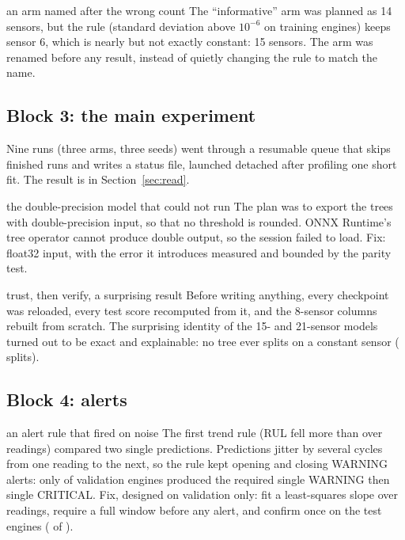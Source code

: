 \documentclass[11pt,a4paper]{article}
\begin{document}
\begin{mistake}{an arm named after the wrong count}
The ``informative'' arm was planned as 14 sensors, but the rule (standard deviation above $10^{-6}$ on training
engines) keeps sensor 6, which is nearly but not exactly constant: 15 sensors. The arm was renamed before any
result, instead of quietly changing the rule to match the name.
\end{mistake}

\subsection{Block 3: the main experiment}
Nine runs (three arms, three seeds) went through a resumable queue that skips finished runs and writes a status
file, launched detached after profiling one short fit. The result is in Section~\ref{sec:read}.

\begin{mistake}{the double-precision model that could not run}
The plan was to export the trees with double-precision input, so that no threshold is rounded. ONNX Runtime's
tree operator cannot produce double output, so the session failed to load. Fix: float32 input, with the error it
introduces measured and bounded by the parity test.
\end{mistake}

\begin{mistake}{trust, then verify, a surprising result}
Before writing anything, every checkpoint was reloaded, every test score recomputed from it, and the 8-sensor
columns rebuilt from scratch. The surprising identity of the 15- and 21-sensor models turned out to be exact
and explainable: no tree ever splits on a constant sensor (\AuditConstSplits{} splits).
\end{mistake}

\subsection{Block 4: alerts}
\begin{mistake}{an alert rule that fired on noise}
The first trend rule (RUL fell more than \OriginalTrendDrop{} over \OriginalTrendWindow{} readings) compared two
single predictions. Predictions jitter by several cycles from one reading to the next, so the rule kept opening and
closing WARNING alerts: only \AlertOriginalPass{} of \SplitVal{} validation engines produced the required single
WARNING then single CRITICAL. Fix, designed on validation only: fit a least-squares slope over
\AlertTrendWindow{} readings, require a full window before any alert, and confirm once on the test engines
(\AlertReplayTestEnginesPassing{} of \AlertReplayTestEngines{}).
\end{mistake}
\end{document}
